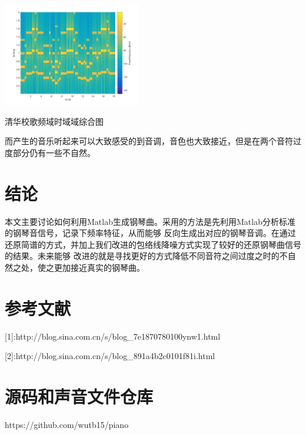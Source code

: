 \documentclass[a4paper,11pt,onecolumn,twoside]{article}
\makeatletter
\newenvironment{figurehere}
  {\def\@captype{figure}}
  {}
\makeatother
\begin{document}
\begin{CJK*}{UTF8}{gbsn}
\begin{multicols}{2}
\begin{figurehere}
\includegraphics[width=6cm]{../source/generate_jpg/song_of_thu2.jpg}\caption{清华校歌频域时域域综合图}\label{thu}
\end{figurehere}
而产生的音乐听起来可以大致感受的到音调，音色也大致接近，但是在两个音符过度部分仍有一些不自然。\\


\section{结论}
\indent 本文主要讨论如何利用Matlab生成钢琴曲。采用的方法是先利用Matlab分析标准的钢琴音信号，记录下频率特征，从而能够
反向生成出对应的钢琴音调。在通过还原简谱的方式，并加上我们改进的包络线降噪方式实现了较好的还原钢琴曲信号的结果。未来能够
改进的就是寻找更好的方式降低不同音符之间过度之时的不自然之处，使之更加接近真实的钢琴曲。
\end{multicols}
\section{参考文献}
[1]:http://blog.sina.com.cn/s/blog_7e1870780100ynw1.html

[2]:http://blog.sina.com.cn/s/blog_891a4b2c0101f81i.html
\section{源码和声音文件仓库}
https://github.com/wutb15/piano
\clearpage
\end{CJK*}
\end{document}
